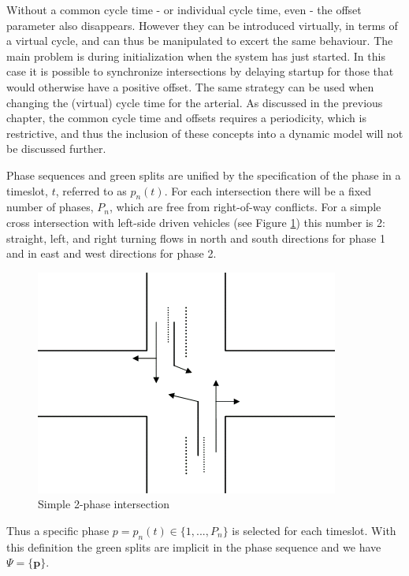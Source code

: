 Without a common cycle time - or individual cycle time, even - the
offset parameter also disappears. However they can be introduced
virtually, in terms of a virtual cycle, and can thus be manipulated to
excert the same behaviour.  The main problem is during initialization
when the system has just started. In this case it is possible to
synchronize intersections by delaying startup for those that would
otherwise have a positive offset. The same strategy can be used when
changing the (virtual) cycle time for the arterial. As discussed in
the previous chapter, the common cycle time and offsets requires a
periodicity, which is restrictive, and thus the inclusion of these
concepts into a dynamic model will not be discussed further.

Phase sequences and green splits are unified by the specification of the phase in a timeslot, $t$, referred to as $p_n(t)$. For each intersection there will be a fixed number of phases, $P_n$, which are free from right-of-way conflicts. For a simple cross intersection with left-side driven vehicles (see Figure \ref{fig:simple_intersection}) this number is 2: straight, left, and right turning flows in north and south directions for phase 1 and in east and west directions for phase 2.

\begin{figure}[!ht]
\begin{center}
\includegraphics[scale=0.4]{simple_intersection.png} 
\end{center}
\caption{Simple 2-phase intersection}
\label{fig:simple_intersection}
\end{figure}

Thus a specific phase $p = p_n(t) \in \lbrace 1,...,P_n \rbrace$ is selected for each timeslot. With this definition the green splits are implicit in the phase sequence and we have $\Psi = \lbrace \textbf{p} \rbrace $.

